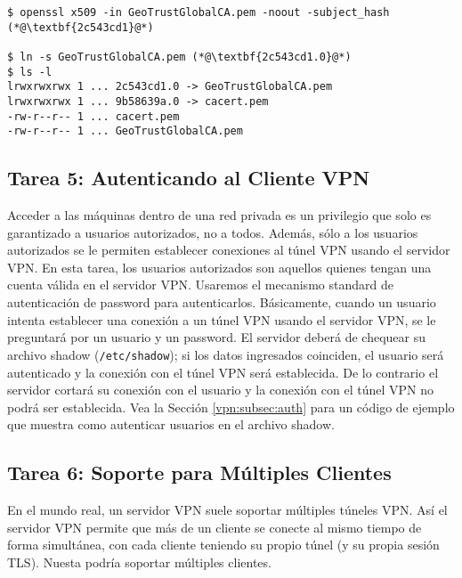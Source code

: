 \begin{lstlisting}
$ openssl x509 -in GeoTrustGlobalCA.pem -noout -subject_hash
(*@\textbf{2c543cd1}@*)

$ ln -s GeoTrustGlobalCA.pem (*@\textbf{2c543cd1.0}@*)
$ ls -l
lrwxrwxrwx 1 ... 2c543cd1.0 -> GeoTrustGlobalCA.pem
lrwxrwxrwx 1 ... 9b58639a.0 -> cacert.pem
-rw-r--r-- 1 ... cacert.pem
-rw-r--r-- 1 ... GeoTrustGlobalCA.pem
\end{lstlisting}


\subsection{Tarea 5: Autenticando al Cliente VPN}

Acceder a las máquinas dentro de una red privada es un privilegio que solo es garantizado a usuarios autorizados, no a todos. Además, sólo a los usuarios autorizados se le permiten establecer conexiones al túnel VPN usando el servidor VPN.
En esta tarea, los usuarios autorizados son aquellos quienes tengan una cuenta válida en el servidor VPN.
Usaremos el mecanismo standard de autenticación de password para autenticarlos. Básicamente, cuando un usuario intenta establecer una conexión a un túnel VPN usando el servidor VPN, se le preguntará por un usuario y un password. El servidor deberá de chequear su archivo shadow (\texttt{/etc/shadow}); si los datos ingresados coinciden, el usuario será autenticado y la conexión con el túnel VPN será establecida. De lo contrario el servidor cortará su conexión con el usuario y la conexión con el túnel VPN no podrá ser establecida.
Vea la Sección \ref{vpn:subsec:auth} para un código de ejemplo que muestra como autenticar usuarios en el archivo shadow.


\subsection{Tarea 6: Soporte para Múltiples Clientes}

En el mundo real, un servidor VPN suele soportar múltiples túneles VPN.
Así el servidor VPN permite que más de un cliente se conecte al mismo tiempo de forma simultánea, con cada cliente teniendo su propio túnel (y su propia sesión TLS). Nuesta \miniVPN podría soportar múltiples clientes.


